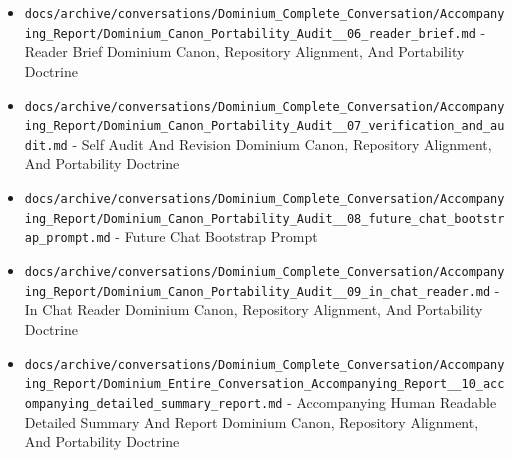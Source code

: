 \documentclass[10.5pt,a4paper,openany]{book}
\begin{document}
\begin{itemize}
\item \texttt{docs/\allowbreak{}archive/\allowbreak{}conversations/\allowbreak{}Dominium\_\allowbreak{}Complete\_\allowbreak{}Conversation/\allowbreak{}Accompanying\_\allowbreak{}Report/\allowbreak{}Dominium\_\allowbreak{}Canon\_\allowbreak{}Portability\_\allowbreak{}Audit\_\allowbreak{}\_\allowbreak{}06\_\allowbreak{}reader\_\allowbreak{}brief.\allowbreak{}md} -\allowbreak{} Reader Brief Dominium Canon, Repository Alignment, And Portability Doctrine
\item \texttt{docs/\allowbreak{}archive/\allowbreak{}conversations/\allowbreak{}Dominium\_\allowbreak{}Complete\_\allowbreak{}Conversation/\allowbreak{}Accompanying\_\allowbreak{}Report/\allowbreak{}Dominium\_\allowbreak{}Canon\_\allowbreak{}Portability\_\allowbreak{}Audit\_\allowbreak{}\_\allowbreak{}07\_\allowbreak{}verification\_\allowbreak{}and\_\allowbreak{}audit.\allowbreak{}md} -\allowbreak{} Self Audit And Revision Dominium Canon, Repository Alignment, And Portability Doctrine
\item \texttt{docs/\allowbreak{}archive/\allowbreak{}conversations/\allowbreak{}Dominium\_\allowbreak{}Complete\_\allowbreak{}Conversation/\allowbreak{}Accompanying\_\allowbreak{}Report/\allowbreak{}Dominium\_\allowbreak{}Canon\_\allowbreak{}Portability\_\allowbreak{}Audit\_\allowbreak{}\_\allowbreak{}08\_\allowbreak{}future\_\allowbreak{}chat\_\allowbreak{}bootstrap\_\allowbreak{}prompt.\allowbreak{}md} -\allowbreak{} Future Chat Bootstrap Prompt
\item \texttt{docs/\allowbreak{}archive/\allowbreak{}conversations/\allowbreak{}Dominium\_\allowbreak{}Complete\_\allowbreak{}Conversation/\allowbreak{}Accompanying\_\allowbreak{}Report/\allowbreak{}Dominium\_\allowbreak{}Canon\_\allowbreak{}Portability\_\allowbreak{}Audit\_\allowbreak{}\_\allowbreak{}09\_\allowbreak{}in\_\allowbreak{}chat\_\allowbreak{}reader.\allowbreak{}md} -\allowbreak{} In Chat Reader Dominium Canon, Repository Alignment, And Portability Doctrine
\item \texttt{docs/\allowbreak{}archive/\allowbreak{}conversations/\allowbreak{}Dominium\_\allowbreak{}Complete\_\allowbreak{}Conversation/\allowbreak{}Accompanying\_\allowbreak{}Report/\allowbreak{}Dominium\_\allowbreak{}Entire\_\allowbreak{}Conversation\_\allowbreak{}Accompanying\_\allowbreak{}Report\_\allowbreak{}\_\allowbreak{}10\_\allowbreak{}accompanying\_\allowbreak{}detailed\_\allowbreak{}summary\_\allowbreak{}report.\allowbreak{}md} -\allowbreak{} Accompanying Human Readable Detailed Summary And Report Dominium Canon, Repository Alignment, And Portability Doctrine

\end{itemize}
\end{document}
